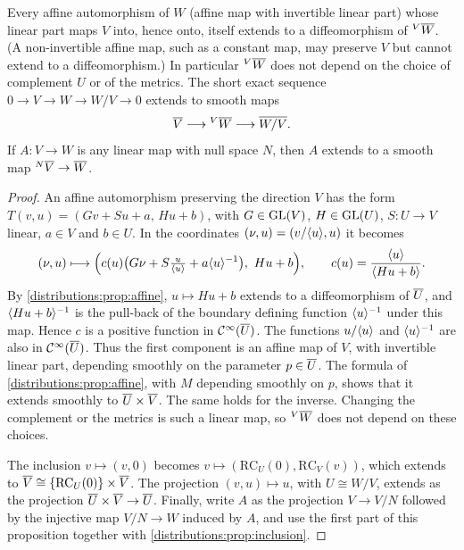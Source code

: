 \begin{proposition}\label{distributions:prop:relative}
Every affine automorphism of $W$ \textup{(}affine map with invertible linear
part\textup{)} whose linear part maps $V$ into, hence onto, itself extends to a
diffeomorphism of ${}^{V}\overline{W}$. \textup{(}A non-invertible affine map, such as a
constant map, may preserve $V$ but cannot extend to a diffeomorphism.\textup{)} In particular ${}^{V}\overline{W}$ does not depend on the
choice of complement $U$ or of the metrics. The short exact sequence
$0\to V\to W\to W/V\to0$ extends to smooth maps
\[
  \overline{V}\longrightarrow{}^{V}\overline{W}\longrightarrow\overline{W/V}.
\]
If $A\colon V\to W$ is any linear map with null space $N$, then $A$ extends to a smooth
map ${}^{N}\overline{V}\to\overline{W}$.
\end{proposition}
\begin{proof}
An affine automorphism preserving the direction $V$ has the form
$T(v,u)=(Gv+Su+a,\,Hu+b)$, with $G\in\operatorname{GL}(V)$, $H\in\operatorname{GL}(U)$, $S\colon U\to V$ linear,
$a\in V$ and $b\in U$. In the coordinates $(\nu,u)=(v/\langle u\rangle,u)$ it becomes
\[
  (\nu,u)\longmapsto\Big(c(u)\big(G\nu+S\tfrac u{\langle u\rangle}+a\langle u\rangle^{-1}\big),\ Hu+b\Big),\qquad
  c(u)=\frac{\langle u\rangle}{\langle Hu+b\rangle}.
\]
By \cref{distributions:prop:affine}, $u\mapsto Hu+b$ extends to a diffeomorphism of
$\overline{U}$, and $\langle Hu+b\rangle^{-1}$ is the pull-back of the boundary defining function
$\langle u\rangle^{-1}$ under this map. Hence $c$ is a positive function in $\mathcal{C}^\infty(\overline{U})$. The
functions $u/\langle u\rangle$ and $\langle u\rangle^{-1}$ are also in $\mathcal{C}^\infty(\overline{U})$. Thus the first
component is an affine map of $V$, with invertible linear part, depending smoothly on the
parameter $p\in\overline{U}$. The formula of \cref{distributions:prop:affine}, with $M$
depending smoothly on $p$, shows that it extends smoothly to
$\overline{U}\times\overline{V}$. The same holds for the inverse. Changing the complement or the
metrics is such a linear map, so ${}^{V}\overline{W}$ does not depend on these choices.

The inclusion $v\mapsto(v,0)$ becomes $v\mapsto(\mathrm{RC}_U(0),\mathrm{RC}_V(v))$,
which extends to $\overline{V}\cong\{\mathrm{RC}_U(0)\}\times\overline{V}$. The projection
$(v,u)\mapsto u$, with $U\cong W/V$, extends as the projection
$\overline{U}\times\overline{V}\to\overline{U}$. Finally, write $A$ as the projection $V\to V/N$ followed
by the injective map $V/N\to W$ induced by $A$, and use the first part of this
proposition together with \cref{distributions:prop:inclusion}.
\end{proof}

